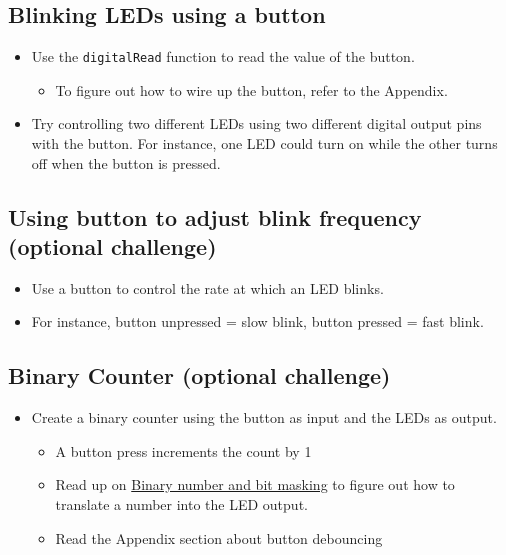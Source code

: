 \documentclass{article}
\begin{document}
\clearpage

\subsection{Blinking LEDs using a button}

\begin{itemize}
    \item Use the \verb|digitalRead| function to read the value of the button.
    \begin{itemize}
        \item To figure out how to wire up the button, refer to the Appendix.
    \end{itemize}
    \item Try controlling two different LEDs using two different digital output pins with the button. For instance, one LED could turn on while the other turns off when the button is pressed.
\end{itemize}

\subsection{Using button to adjust blink frequency (optional challenge)}

\begin{itemize}
    \item Use a button to control the rate at which an LED blinks.
    \item For instance, button unpressed = slow blink, button pressed = fast blink.
\end{itemize}

\subsection{Binary Counter (optional challenge)}

\begin{itemize}
    \item Create a binary counter using the button as input and the LEDs as output.
    \begin{itemize}
        \item A button press increments the count by 1
        \item Read up on \href{https://www.clivemaxfield.com/coolbeans/masking-and-the-c-c-bitwise-operators/}{Binary number and bit masking} to figure out how to translate a number into the LED output.
        \item Read the Appendix section about button debouncing
    \end{itemize}
\end{itemize}
\end{document}
